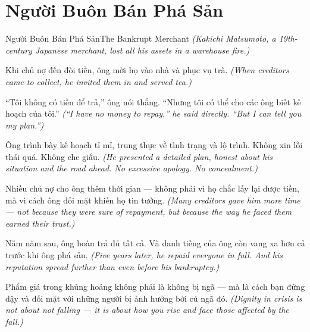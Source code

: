 \section{Người Buôn Bán Phá Sản}
\begin{truyen}{Người Buôn Bán Phá Sản}{The Bankrupt Merchant}
\textit{(Kakichi Matsumoto, a 19th-century Japanese merchant, lost all his assets in a warehouse fire.)}

Khi chủ nợ đến đòi tiền, ông mời họ vào nhà và phục vụ trà.
\textit{(When creditors came to collect, he invited them in and served tea.)}

``Tôi không có tiền để trả,'' ông nói thẳng. ``Nhưng tôi có thể cho các ông biết kế hoạch của tôi.''
\textit{(``I have no money to repay,'' he said directly. ``But I can tell you my plan.'')}

Ông trình bày kế hoạch tỉ mỉ, trung thực về tình trạng và lộ trình. Không xin lỗi thái quá. Không che giấu.
\textit{(He presented a detailed plan, honest about his situation and the road ahead. No excessive apology. No concealment.)}

Nhiều chủ nợ cho ông thêm thời gian — không phải vì họ chắc lấy lại được tiền, mà vì cách ông đối mặt khiến họ tin tưởng.
\textit{(Many creditors gave him more time — not because they were sure of repayment, but because the way he faced them earned their trust.)}

Năm năm sau, ông hoàn trả đủ tất cả. Và danh tiếng của ông còn vang xa hơn cả trước khi ông phá sản.
\textit{(Five years later, he repaid everyone in full. And his reputation spread further than even before his bankruptcy.)}

\end{truyen}

\begin{baihoc}
Phẩm giá trong khủng hoảng không phải là không bị ngã — mà là cách bạn đứng dậy và đối mặt với những người bị ảnh hưởng bởi cú ngã đó.
\textit{(Dignity in crisis is not about not falling — it is about how you rise and face those affected by the fall.)}
\end{baihoc}
\ngancach

